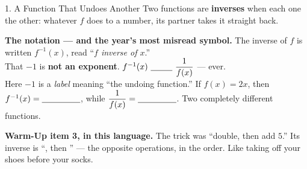 \documentclass[10pt]{article}
\begin{document}
\begin{notesbox}{1. A Function That Undoes Another}
Two functions are \textbf{inverses} when each one \blank{2.6cm} the other: whatever $f$ does to a
number, its partner takes it straight back.
\begin{center}
\end{center}
\vspace{-2pt}
\begin{center}
\begin{tcolorbox}[colback=redbg, colframe=redacc, boxrule=0.8pt, arc=1.5mm, width=0.94\linewidth,
    left=3mm, right=3mm, top=2mm, bottom=2mm]
\small
\textbf{The notation --- and the year's most misread symbol.} The inverse of $f$ is written
$f^{-1}(x)$, read ``\emph{$f$ inverse of $x$}.''
\\[3pt]
That $-1$ is \textbf{not an exponent}. \quad
$f^{-1}(x)\ \blank{0.9cm}\ \dfrac{1}{f(x)}$ \quad --- ever.
\\[3pt]
Here $-1$ is a \emph{label} meaning ``the undoing function.'' If $f(x)=2x$, then
$f^{-1}(x)=\blank{1.6cm}$, \; while $\dfrac{1}{f(x)}=\blank{1.6cm}$. Two completely different
functions.
\end{tcolorbox}
\end{center}
\vspace{2pt}
\textbf{Warm-Up item 3, in this language.} The trick was ``double, then add $5$.'' Its inverse is
``\blank{2.2cm}, then \blank{2.2cm}'' --- the opposite operations, in the
\blank{2.2cm} order. Like taking off your shoes before your socks.
\end{notesbox}
\end{document}
